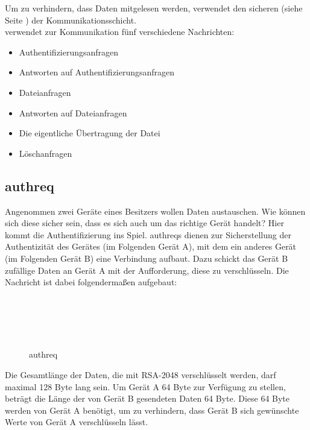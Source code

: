 Um zu verhindern, dass Daten mitgelesen werden, verwendet \sblit den sicheren  (siehe Seite \pageref{Applicationchannel}) der Kommunikationsschicht.\\
\sblitg verwendet zur Kommunikation fünf verschiedene Nachrichten:
\begin{itemize}
	\item Authentifizierungsanfragen
	\item Antworten auf Authentifizierungsanfragen
	\item Dateianfragen
	\item Antworten auf Dateianfragen
	\item Die eigentliche Übertragung der Datei
	\item Löschanfragen
\end{itemize}
\subsection{\gls{authreq}}
Angenommen zwei Geräte eines Besitzers wollen Daten austauschen. Wie können sich diese sicher sein, dass es sich auch um das richtige Gerät handelt? Hier kommt die Authentifizierung ins Spiel. \gls{authreq}s dienen zur Sicherstellung der Authentizität des Gerätes (im Folgenden Gerät A), mit dem ein anderes Gerät (im Folgenden Gerät B) eine Verbindung aufbaut. Dazu schickt das Gerät B zufällige Daten an Gerät A mit der Aufforderung, diese zu verschlüsseln. Die Nachricht ist dabei folgendermaßen aufgebaut:
\begin{figure}[H]
\begin{centering}

\begin{bytefield}[bitwidth=3em]{8}
	\\
	 \\
	
	\begin{rightwordgroup}{\isprotomsgtype}
	\end{rightwordgroup} \\
	
	\begin{rightwordgroup}{\isprotomsgdata}
	\end{rightwordgroup}
	
\end{bytefield}

\par\end{centering}
\protect\caption{\gls{authreq}}
\end{figure}
Die Gesamtlänge der Daten, die mit RSA-2048 verschlüsselt werden, darf maximal 128 Byte lang sein. Um Gerät A 64 Byte zur Verfügung zu stellen, beträgt die Länge der von Gerät B gesendeten Daten 64 Byte. Diese 64 Byte werden von Gerät A benötigt, um zu verhindern, dass Gerät B sich gewünschte Werte von Gerät A verschlüsseln lässt.

